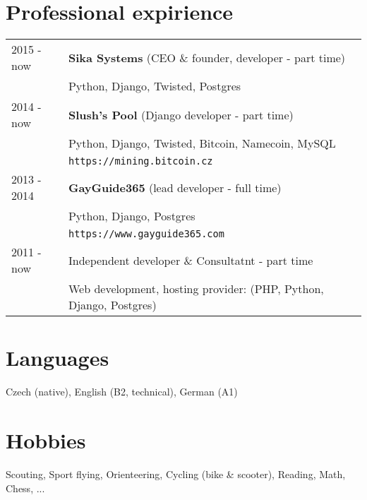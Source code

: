 \documentclass[12pt,a4paper]{article}
\begin{document}
\section*{Professional expirience}
\begin{tabular}{@{}p{2cm}l}
2015 - now & {\bf Sika Systems} (CEO \& founder, developer - part time)\\
 & Python, Django, Twisted, Postgres\\
2014 - now & {\bf Slush's Pool} (Django developer - part time)\\
 & Python, Django, Twisted, Bitcoin, Namecoin, MySQL\\
 & \texttt{https://mining.bitcoin.cz}\\
2013 - 2014 & {\bf GayGuide365} (lead developer - full time)\\
 & Python, Django, Postgres\\
 & \texttt{https://www.gayguide365.com}\\
2011 - now & Independent developer \& Consultatnt - part time\\
 & Web development, hosting provider: (PHP, Python, Django, Postgres)\\
\end{tabular}

\section*{Languages}
Czech (native), English (B2, technical), German (A1)\\

\section*{Hobbies}
Scouting, Sport flying, Orienteering, Cycling (bike \& scooter), Reading, Math, Chess, ...
\\
\end{document}
